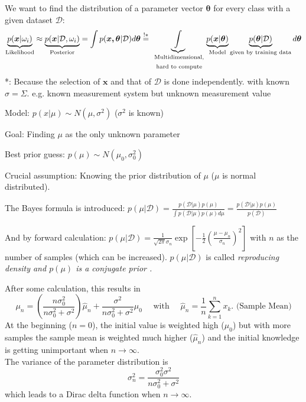   We want to find the distribution of a parameter vector $\bm{\theta}$ for every class with a given dataset $\mathcal{D}$:
  $$\underbrace{p(\bm x |\omega_i)}_{\text{Likelihood}}\approx \underbrace{p(\bm{x}|\mathcal{D},\omega_i)}_{\text{Posterior}} = \int{p(\bm{x,\theta}|\mathcal{D}) d \bm{\theta}}\overset{!*}{=}
  \underbrace{\int}_{\text{
  	\parbox{2.3cm}{\centering 
  		Multidimensional, hard to compute}}  
	}
  \underbrace{p(\bm{x}|\bm{\theta})}_{\text{Model}} 
  \underbrace{p(\bm{\theta}|\mathcal{D})}_{\text{given by training data}} d\bm{\theta}$$
 *: Because the selection of $\bm{x}$ and that of $\mathcal{D}$ is done independently.
  with known $\sigma=\Sigma$. e.g. known measurement system but unknown measurement value\\
  \begin{aufzaehlung}
    \item Model: $p(x|\mu) \sim N(\mu, \sigma^2)$ ($\sigma^2$ is known)
    \item Goal: Finding $\mu$ as the only unknown parameter
    \item Best prior guess: $p(\mu) \sim N(\mu_0, \sigma_0^2)$
    \item Crucial assumption: Knowing the prior distribution of $\mu$ ($\mu$ is normal distributed).
    \item The Bayes formula is introduced: 
      $p(\mu|\mathcal{D}) = \frac{p(\mathcal{D}|\mu) p(\mu)}{\int p(\mathcal{D}|\mu) p(\mu) d\mu} = \frac{p(\mathcal{D}|\mu) p(\mu)}{p(\mathcal{D})}$
    \item And by forward calculation: 
      $p(\mu|\mathcal{D}) = \frac{1}{\sqrt{2\pi} \sigma_n} \exp[-\frac12 (\frac{\mu-\mu_n}{\sigma_n})^2]$
      with $n$ as the number of samples (which can be increased). 
      $p(\mu|\mathcal{D})$ is called \em reproducing density \em and $p(\mu)$ is a \em conjugate prior \em.
    \item After some calculation, this results in
      $$\mu_n = (\frac{n\sigma_0^2}{n\sigma_0^2 + \sigma^2})\hat{\mu}_n + 
      \frac{\sigma^2}{n\sigma_0^2 + \sigma^2} \mu_0 \quad \text{ with } \quad
      \hat{\mu}_n = \frac1n \sum\limits_{k=1}^{n}x_k. \text{ (Sample Mean)}$$
      At the beginning ($n=0$), the initial value is weighted high ($\mu_0$) but with more samples
      the sample mean is weighted much higher ($\hat{\mu}_n$) and the initial knowledge is getting 
      unimportant when $n \rightarrow \infty$.\\
      The variance of the parameter distribution is
      $$\sigma_n^2 = \frac{\sigma_0^2 \sigma^2}{n\sigma_0^2 + \sigma^2}$$
      which leads to a Dirac delta function when $n \rightarrow \infty$.
  \end{aufzaehlung}
  
